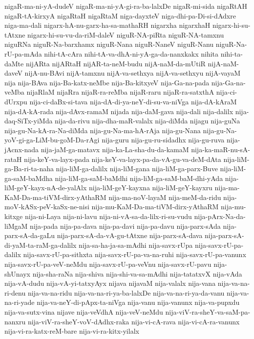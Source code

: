{nigaR-ma-ni-yA-dudeV
nigaR-ma-ni-yA-gi-ra-ba-lalxDe
nigaR-mi-sida
nigaRtAH
nigaR-tA-kirxyA
nigaRtaH
nigaRtaM
niga-dayxteV
niga-dhi-pa-Di-si-dAdxre
niga-ma-dali
nigarx-hA-nu-garx-ha-sa-mathaRH
nigarxha
nigarxhaH
nigarx-hi-su-tAtxne
nigarx-hi-su-vu-da-riM-daleV
niguR-NA-piRta
niguR-NA-tamxnu
niguRNa
niguR-Na-barxhamx
niguR-Nana
niguR-NaneV
niguR-Nanu
niguR-Na-rU-pa-mAda
nihi-tA-cAra
nihi-tA-va-dhA-ni-yA-ga-da-nanxkakx
nihita
nihi-ta-daMte
nijARta
nijARtaH
nijAR-ta-neM-budu
nijA-naM-da-mUtiR
nijA-naM-daveV
nijA-nu-BAvi
nijA-tamxnu
nijA-va-sethxya
nijA-va-sethxyu
nijA-vayaM
nija
nija-BAva
nija-Ba-katx-neMbe
nija-Ba-kitxyeV
nija-Ga-na-pada
nija-Ga-na-veMba
nijaRlaM
nijaRra
nijaR-ra-reMba
nijaR-raru
nijaR-ra-satxthA
nija-ci-dUrxpu
nija-ci-daBx-si-tava
nija-dA-di-ya-neY-di-su-va-niVga
nija-dA-kAraM
nija-dA-kA-rada
nija-dAvx-ramaM
nijada
nija-daM-gava
nija-dali
nija-dalilx
nija-daq-SiTx-yiMda
nija-da-rivu
nija-dha-maR-valalx
nija-diMda
nijagu
nija-guNa
nija-gu-Na-kA-ra-Na-diMda
nija-gu-Na-ma-hA-rAja
nija-gu-Nana
nija-gu-Na-yoV-gi-ga-LiM-bu-goM-Da-rAgi
nija-guru
nija-gu-ru-sidadhx
nija-gu-ruva
nija-jAcnx-nada
nija-jaM-ga-matavx
nija-ka-La-sha-du-da-kamaM
nija-ka-maR-nu-sA-rataH
nija-keY-va-layx-pada
nija-keY-va-layx-pa-da-vA-gu-va-deM-dAta
nija-liM-ga-Ba-ri-ta-naha
nija-liM-ga-dalilx
nija-liM-gana
nija-liM-ga-parx-Buve
nija-liM-ga-saM-baMdha
nija-liM-ga-saM-baMdhi
nija-liM-ga-saM-baM-dhi-yAda
nija-liM-geY-kayx-nA-de-yalAlx
nija-liM-geY-kayxna
nija-liM-geY-kayxru
nija-ma-KaM-Da-ma-tiVM-dirx-yAthaRM
nija-ma-noV-layaM
nija-meM-da-ridu
nija-moV-kASx-peV-kaSx-ne-nisi
nija-mu-KaM-Da-ma-tiVM-dirx-yAthaRM
nija-mu-kitxge
nija-ni-Laya
nija-ni-lavu
nija-ni-vA-sa-da-lilx-ri-su-vudu
nija-pArx-Na-da-liMgaM
nija-pada
nija-pa-dava
nija-pa-davi
nija-pa-davu
nija-parx-sAda
nija-parx-sA-da-gaLu
nija-parx-sA-da-vA-gu-tAtxne
nija-parx-sA-dava
nija-parx-sA-di-yaM-ta-raM-ga-dalilx
nija-sa-ha-ja-sa-mAdhi
nija-savx-rUpa
nija-savx-rU-pa-dalilx
nija-savx-rU-pa-sithxta
nija-savx-rU-pa-va-na-ruhi
nija-savx-rU-pa-vanunx
nija-savx-rU-pa-veV-neMdu
nija-savx-rU-pa-veVnu
nija-savx-rU-pavu
nija-shUnayx
nija-sha-raNa
nija-shiva
nija-shi-va-sa-mAdhi
nija-tatatxvX
nija-vAda
nija-vA-dudu
nija-vA-yi-tatxyAyx
nijava
nijavaM
nija-valalx
nija-vana
nija-va-na-ri-denu
nija-va-na-ridu
nija-va-na-ri-ya-ba-lalxDe
nija-va-na-ri-ya-da-vanu
nija-va-na-ri-yade
nija-va-neY-di-pApx-ta-niVga
nija-vanu
nija-vanunx
nija-va-pupxdu
nija-va-sutx-vina
nijave
nija-veVdhA
nija-veV-neMdu
nija-viV-ra-sheY-va-saM-pa-nanxru
nija-viV-ra-sheY-voV-dAdhx-raka
nija-vi-cA-rava
nija-vi-cA-ra-vanunx
nija-vi-ra-katx-reM-bare
nija-vi-ra-kitx-yilalx
}
